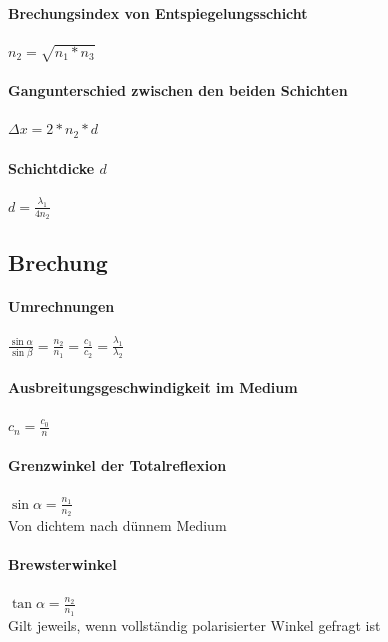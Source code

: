 \documentclass[12pt, a4paper]{scrreprt}
\begin{document}
\paragraph{Brechungsindex von Entspiegelungsschicht} \dotfill \(n_2 = \sqrt{n_1 * n_3}\)
\paragraph{Gangunterschied zwischen den beiden Schichten} \dotfill \(\Delta x = 2 * n_2 * d\)
\paragraph{Schichtdicke \(d\)} \dotfill \(d = \frac{\lambda_1}{4n_2}\)


\subsection{Brechung}

\paragraph{Umrechnungen} \dotfill \(\frac{\sin \alpha}{\sin \beta} = \frac{n_2}{n_1} = \frac{c_1}{c_2} = \frac{\lambda_1}{\lambda_2}\)\\
\myhspace{} 
\paragraph{Ausbreitungsgeschwindigkeit im Medium} \dotfill \(c_n = \frac{c_0}{n}\)
\paragraph{Grenzwinkel der Totalreflexion} \dotfill \(\sin \alpha = \frac{n_1}{n_2}\)\\
\myhspace{} Von dichtem nach dünnem Medium
\paragraph{Brewsterwinkel} \dotfill \(\tan \alpha = \frac{n_2}{n_1}\)\\
\myhspace{} Gilt jeweils, wenn vollständig polarisierter Winkel gefragt ist\\
\myhspace{} \\
\myhspace{} 
\end{document}
